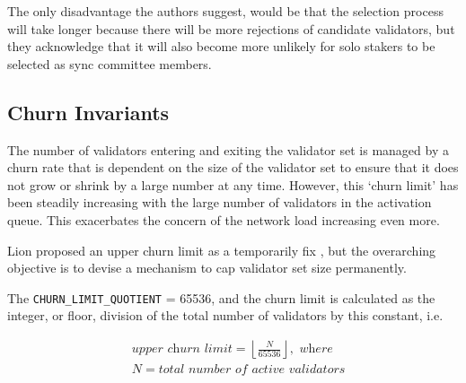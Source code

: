 \documentclass{article}
\begin{document}

The only disadvantage the authors suggest, would be that the selection process
will take longer because there will be more rejections of candidate validators,
but they acknowledge that it will also become more unlikely for solo stakers to
be selected as sync committee members.   

\subsection{Churn Invariants}
The number of validators entering and exiting the validator set is managed by a
churn rate that is dependent on the size of the validator set to ensure that it
does not grow or shrink by a large number at any time. However, this `churn
limit' has been steadily increasing with the large number of validators in the
activation queue. This exacerbates the concern of the network load increasing
even more. 

Lion \cite{dapplion} proposed an upper churn limit as a temporarily fix
\cite{dapplion}, but the overarching objective is to devise a mechanism to cap
validator set size permanently.

The \texttt{CHURN\_LIMIT\_QUOTIENT} = 65536, and the churn limit is calculated
as the integer, or floor, division of the total number of validators by this
constant, i.e. 

\begin{equation*}
  \begin{split}
& \textit{upper churn limit} = \left\lfloor \frac{N}{65536} \right\rfloor, \textit{ where} \\
& N = \textit{total number of active validators}
  \end{split}
\end{equation*}
\end{document}
